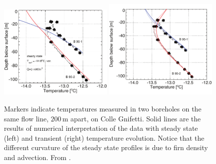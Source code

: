 \documentclass[parskip=half]{scrartcl}
\newcommand{\unit}[1]{\ensuremath{\,\mathrm{#1}}}
\begin{document}
\begin{figure}[p] \centering
 \includegraphics[width=0.49\textwidth]{figures/c_temp_steady_var_k32}
\hfill
   \includegraphics[width=0.49\textwidth]{figures/c_temp_trans_k32}
   \caption{Markers indicate temperatures measured in two boreholes on
the same flow line, $200\unit{m}$ apart, on Colle Gnifetti.  Solid
lines are the results of numerical interpretation of the data with
steady state (left) and transient (right) temperature
evolution. Notice that the different curvature of the steady state
profiles is due to firn density and advection. From
\cite{LuethiFunk2001}.}
 \label{fig:colle-profiles}
\end{figure}
\end{document}
